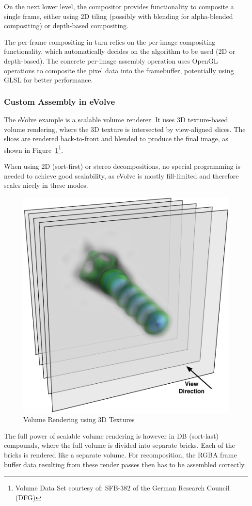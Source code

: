 \documentclass[10pt,a4]{scrartcl}
\newcommand{\fig}[1]{Figure~\ref{#1}}
\begin{document}
On the next lower level, the compositor provides functionality to
composite a single frame, either using 2D tiling (possibly with blending
for alpha-blended compositing) or depth-based compositing. 

The per-frame compositing in turn relies on the per-image compositing
functionality, which automatically decides on the algorithm to be used
(2D or depth-based). The concrete per-image assembly operation uses
OpenGL operations to composite the pixel data into the framebuffer,
potentially using GLSL for better performance.


\subsubsection{Custom Assembly in eVolve}

The \textsf{eVolve} example is a scalable volume renderer. It uses 3D
texture-based volume rendering, where the 3D texture is intersected by
view-aligned slices. The slices are rendered back-to-front and blended
to produce the final image, as shown in \fig{fSlices}\footnote{Volume
  Data Set courtesy of: SFB-382 of the German Research Council (DFG)}.

When using 2D (sort-first) or stereo decompositions, no special
programming is needed to achieve good scalability, as \textsf{eVolve} is
mostly fill-limited and therefore scales nicely in these modes. 

\begin{figure}
  \includegraphics[width=.382\textwidth]{images/slices.pdf}
  {\caption{\label{fSlices}Volume Rendering using 3D Textures}}
\end{figure}
The full power of scalable volume rendering is however in DB (sort-last)
compounds, where the full volume is divided into separate bricks. Each
of the bricks is rendered like a separate volume. For recomposition, the
\textsf{RGBA} frame buffer data resulting from these render passes then
has to be assembled correctly. 
\end{document}
